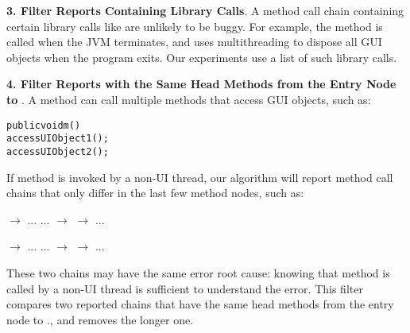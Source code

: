 



\textbf{3. Filter Reports Containing Library Calls}. A
method call chain containing certain library calls
like  are unlikely to
be buggy. For example, the 
method is called when the JVM terminates, and uses multithreading
to dispose all GUI objects when the program exits.
Our experiments use a list of \libnum such library calls.

\textbf{4. Filter Reports with the Same Head Methods from the Entry Node to }. A method can call
multiple methods that access GUI objects, such as:

\pagebreak[3]
\vspace{-2mm}                   %
\begin{CodeOut}
\begin{alltt}
     public void m() \ttlcb
         accessUIObject1();
         accessUIObject2();
     \ttrcb
\end{alltt}
\end{CodeOut}
\vspace{-2mm}
If method  is invoked by a non-UI thread, our algorithm will
report method call chains that
only differ in the last few method nodes, such as:

 $\rightarrow$ ... ... $\rightarrow$  $\rightarrow$  ...

 $\rightarrow$ ... ... $\rightarrow$  $\rightarrow$  ...

\noindent
These two chains may have the same error root cause: knowing that
method  is called by a non-UI thread is sufficient to understand
the error.
This filter compares two reported chains that have the same
head methods from the entry node to .,
and removes the longer one.


